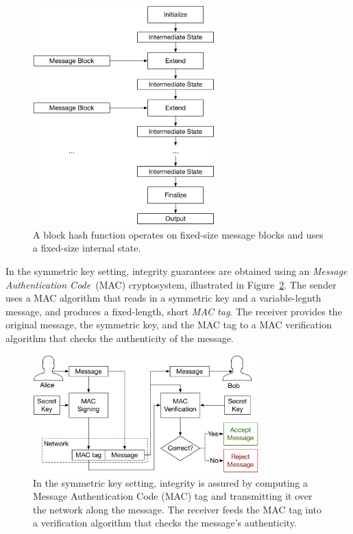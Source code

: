 \begin{figure}[hbt]
  \centering
  \includegraphics[width=70mm]{figures/block_hash_operation.pdf}
  \caption{
    A block hash function operates on fixed-size message blocks and uses a
    fixed-size internal state.
  }
  \label{fig:block_hash_operation}
\end{figure}

In the symmetric key setting, integrity guarantees are obtained using an
\textit{Message Authentication Code}~(MAC) cryptosystem, illustrated in
Figure~\ref{fig:symmetric_mac}. The sender uses a MAC algorithm that reads in a
symmetric key and a variable-legnth message, and produces a fixed-length, short
\textit{MAC tag}. The receiver provides the original message, the symmetric
key, and the MAC tag to a MAC verification algorithm that checks the
authenticity of the message.

\begin{figure}[hbt]
  \centering
  \includegraphics[width=87mm]{figures/symmetric_mac.pdf}
  \caption{
    In the symmetric key setting, integrity is assured by computing a
    Message Authentication Code (MAC) tag and transmitting it over the network
    along the message. The receiver feeds the MAC tag into a verification
    algorithm that checks the message's authenticity.
  }
  \label{fig:symmetric_mac}
\end{figure}

